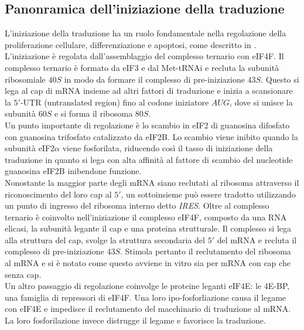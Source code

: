 	\subsection{Panonramica dell'iniziazione della traduzione}
	L'iniziazione della traduzione ha un ruolo fondamentale nella regolazione della proliferazione cellulare, differenziazione e apoptosi, come descritto in \cite{transconp53}.
	L'iniziazione \`e regolata dall'assemblaggio del complesso ternario con eIF4F.
	Il complesso ternario \`e formato da eIF3 e dal Met-tRNAi e recluta la subunit\`a ribosomiale $40S$ in modo da formare il complesso di pre-iniziazione $43S$.
	Questo si lega al cap di mRNA insieme ad altri fattori di traduzione e inizia a scansionare la $5'$-UTR (untranslated region) fino al codone iniziatore $AUG$, dove si unisce la subunit\`a $60S$ e si forma il ribosoma $80S$.\\
	Un punto importante di regolazione \`e lo scambio in eIF2 di guanosina difosfato con guanosina trifosfato catalizzato da eIF2B.
	Lo scambio viene inibito quando la subunit\`a eIF2$\alpha$ viene fosforilata, riducendo cos\`i il tasso di iniziazione della traduzione in quanto si lega con alta affinit\`a al fattore di scambio del nucleotide guanosina eIF2B inibendone funzione.\\
	Nonostante la maggior parte degli mRNA siano reclutati al ribosoma attraverso il riconoscimento del loro cap al $5'$, un sottoinsieme pu\`o essere tradotto utilizzando un punto di ingresso del ribosoma interno detto \emph{IRES}.
	Oltre al complesso ternario \`e coinvolto nell'iniziazione il complesso eIF4F, composto da una RNA elicasi, la subunit\`a legante il cap e una proteina strutturale.
	Il complesso si lega alla struttura del cap, svolge la struttura secondaria del $5'$ del mRNA e recluta il complesso di pre-iniziazione $43S$.
	Stimola pertanto il reclutamento del ribosoma al mRNA e si \`e notato come questo avviene in vitro sia per mRNA con cap che senza cap.\\
	Un altro passaggio di regolazione coinvolge le proteine leganti eIF4E: le 4E-BP, una famiglia di repressori di eIF4F.
	Una loro ipo-fosforliazione causa il legame con eIF4E e impedisce il reclutamento del macchinario di traduzione al mRNA.
	La loro fosforilazione invece distrugge il legame e favorisce la traduzione.

